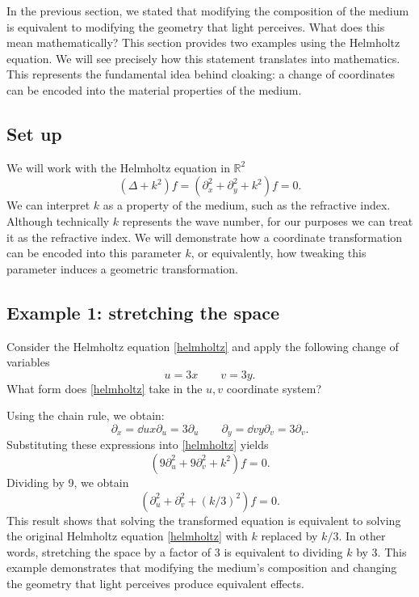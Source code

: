 In the previous section, we stated that modifying the composition of the medium
is equivalent to modifying the geometry that light perceives. What does this
mean mathematically? This section provides two examples using the Helmholtz
equation. We will see precisely how this statement translates into mathematics.
This represents the fundamental idea behind cloaking: a change of coordinates
can be encoded into the material properties of the medium.

\subsection{Set up}
We will work with the Helmholtz equation in \(\mathbb{R}^2\)
\begin{equation}\label{helmholtz}
	(\Delta +k^2)f=(\partial_x^2+\partial_y^2+k^2)f=0.
\end{equation}
We can interpret \(k\) as a property of the medium, such as the refractive
index. Although technically \(k\) represents the wave number, for our purposes
we can treat it as the refractive index. We will demonstrate how a coordinate
transformation can be encoded into this parameter \(k\), or equivalently, how
tweaking this parameter induces a geometric transformation.

\subsection{Example 1: stretching the space}
Consider the Helmholtz equation \eqref{helmholtz} and apply the following
change of variables
\begin{equation*}
	u=3x \qquad
	v=3y.
\end{equation*}
What form does \eqref{helmholtz} take in the \(u,v\) coordinate system?

Using the chain rule, we obtain:
\begin{equation*}
	\partial_x=\dd{u}{x}\partial_u=3\partial_u \qquad
	\partial_y=\dd{v}{y}\partial_v=3\partial_v.
\end{equation*}
Substituting these expressions into \eqref{helmholtz} yields
\begin{equation*}
	(9\partial_u^2+9\partial_v^2+k^2)f=0.
\end{equation*}
Dividing by 9, we obtain
\begin{equation*}
	(\partial_u^2+\partial_v^2+(k/3)^2)f=0.
\end{equation*}
This result shows that solving the transformed equation is equivalent to solving
the original Helmholtz equation \eqref{helmholtz} with \(k\) replaced by
\(k/3\). In other words, stretching the space by a factor of 3 is equivalent to
dividing \(k\) by 3. This example demonstrates that modifying the medium's
composition and changing the geometry that light perceives produce equivalent
effects.

